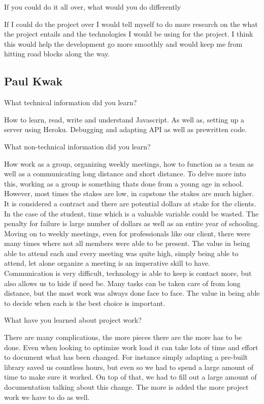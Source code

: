 \documentclass[letterpaper, 10pt, draftclsnofoot, compsoc, onecolumn]{IEEEtran}
\begin{document}
If you could do it all over, what would you do differently

If I could do the project over I would tell myself to do more research on the what the project entails and the technologies I would be using for the project. I think this would help the development go more smoothly and would keep me from hitting road blocks along the way.

\subsection{Paul Kwak}
What technical information did you learn?

How to learn, read, write and understand Javascript. As well as, setting up a server using Heroku. Debugging and adapting API as well as prewritten code.

What non-technical information did you learn?

How work as a group, organizing weekly meetings, how to function as a team as well as a communicating long distance and short distance. To delve more into this, working as a group is something thats done from a young age in school. However, most times the stakes are low, in capstone the stakes are much higher. It is considered a contract and there are potential dollars at stake for the clients. In the case of the student, time which is a valuable variable could be wasted. The penalty for failure is large number of dollars as well as an entire year of schooling. Moving on to weekly meetings, even for professionals like our client, there were many times where not all members were able to be present. The value in being able to attend each and every meeting was quite high, simply being able to attend, let alone organize a meeting is an imperative skill to have. Communication is very difficult, technology is able to keep is contact more, but also allows us to hide if need be. Many tasks can be taken care of from long distance, but the most work was always done face to face. The value in being able to decide when each is the best choice is important.

What have you learned about project work?

There are many complications, the more pieces there are the more has to be done. Even when looking to optimize work load it can take lots of time and effort to document what has been changed. For instance simply adapting a pre-built library saved us countless hours, but even so we had to spend a large amount of time to make sure it worked. On top of that, we had to fill out a large amount of documentation talking about this change. The more is added the more project work we have to do as well.
\end{document}
